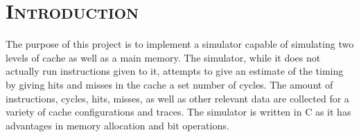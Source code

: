 \documentclass[cacheSimReport.tex]{subfiles}
\begin{document}
\section*{\textsc{\Large Introduction}}

The purpose of this project is to implement a simulator capable of simulating two levels of cache as well as a main memory. The simulator, while it does not actually run instructions given to it, attempts to give an estimate of the timing by giving hits and misses in the cache a set number of cycles. The amount of instructions, cycles, hits, misses, as well as other relevant data are collected for a variety of cache configurations and traces. The simulator is written in C as it has advantages in memory allocation and bit operations.
\end{document}
